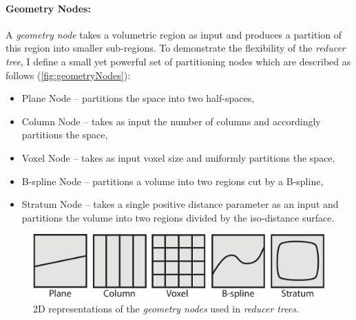 \paragraph{Geometry Nodes:}A \emph{geometry node} takes a volumetric region as input and produces
a partition of this region into smaller sub-regions. 
To demonstrate the flexibility of the \emph{reducer tree}, I define a small yet powerful set of partitioning nodes which are described as follows 
 (\autoref{fig:geometryNodes}):\vspace{-0.25\baselineskip}
\begin{itemize}
\item Plane Node --  partitions the space into two half-spaces, \vspace{-0.25\baselineskip}
\item Column Node -- takes as input the number of columns and accordingly partitions the space,\vspace{-0.25\baselineskip}
\item Voxel Node -- takes as input voxel size and uniformly partitions the space,\vspace{-0.25\baselineskip}
\item B-spline Node -- partitions a volume into two regions cut by a B-spline,\vspace{-0.25\baselineskip}
\item Stratum Node -- takes a single positive distance parameter as an input and partitions the volume into two regions divided by the iso-distance surface.\vspace{-0.25\baselineskip}
\end{itemize} 

\begin{figure}[h]
\centering
\includegraphics[width=0.7\linewidth]{figure/geometryNodes}
\caption{2D representations  of the \emph{geometry nodes} used in \emph{reducer trees}.}
\label{fig:geometryNodes}
\end{figure}

